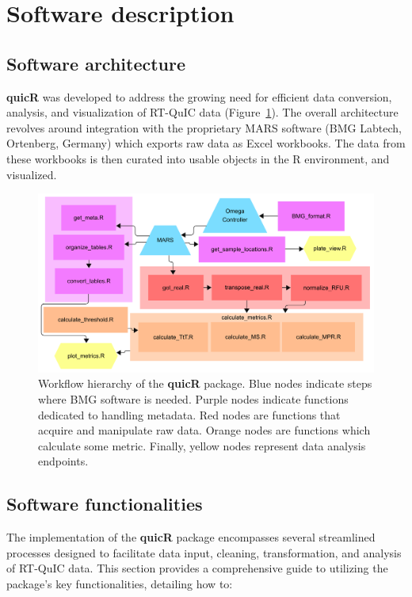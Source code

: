 \documentclass[preprint,12pt,a4paper]{elsarticle}
\begin{document}
    \section{Software description}
        \subsection{Software architecture}
            \textbf{quicR} was developed to address the growing need for efficient data conversion, analysis, and visualization of RT-QuIC data (Figure~\ref{fig:workflow}). The overall architecture revolves around integration with the proprietary MARS software (BMG Labtech, Ortenberg, Germany) which exports raw data as Excel workbooks. The data from these workbooks is then curated into usable objects in the R environment, and visualized.

            \begin{figure}[ht]
                \centering
                \includegraphics[width=\textwidth]{images/workflow.png}
                \caption{Workflow hierarchy of the \textbf{quicR} package. Blue nodes indicate steps where BMG software is needed. Purple nodes indicate functions dedicated to handling metadata. Red nodes are functions that acquire and manipulate raw data. Orange nodes are functions which calculate some metric. Finally, yellow nodes represent data analysis endpoints.}\label{fig:workflow}
            \end{figure}

        \subsection{Software functionalities}
            The implementation of the \textbf{quicR} package encompasses several streamlined processes designed to facilitate data input, cleaning, transformation, and analysis of RT-QuIC data. This section provides a comprehensive guide to utilizing the package's key functionalities, detailing how to:
                
\end{document}
